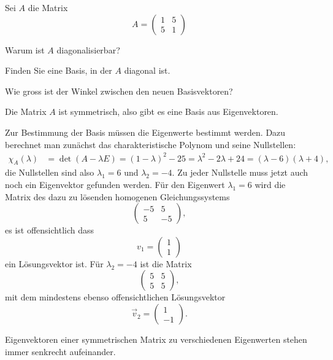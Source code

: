 Sei $A$ die Matrix
\[
A=\begin{pmatrix}
1&5\\
5&1
\end{pmatrix}
\]
\begin{teilaufgaben}
\item Warum ist $A$ diagonalisierbar?
\item Finden Sie eine Basis, in der $A$ diagonal ist.
\item Wie gross ist der Winkel zwischen den neuen Basisvektoren?
\end{teilaufgaben}

\begin{loesung}
\begin{teilaufgaben}
\item
Die Matrix $A$ ist symmetrisch, also gibt es eine Basis aus
Eigenvektoren.
\item
Zur Bestimmung der Basis müssen die Eigenwerte bestimmt werden.
Dazu berechnet man zunächst das charakteristische Polynom und
seine Nullstellen:
\begin{align*}
\chi_A(\lambda)
&=\det(A-\lambda E)=(1-\lambda)^2-25=\lambda^2-2\lambda +24
=(\lambda-6)(\lambda +4),
\end{align*}
die Nullstellen sind also $\lambda_1=6$ und $\lambda_2=-4$. Zu jeder
Nullstelle muss jetzt auch noch ein Eigenvektor gefunden werden.
Für den Eigenwert $\lambda_1=6$ wird die Matrix des dazu zu lösenden
homogenen Gleichungssystems
\[
\begin{pmatrix}-5&5\\5&-5\end{pmatrix},
\]
es ist offensichtlich dass
\[
v_1=\begin{pmatrix}1\\1\end{pmatrix}
\]
ein Lösungsvektor ist. Für $\lambda_2=-4$ ist die Matrix
\[
\begin{pmatrix}5&5\\5&5\end{pmatrix},
\]
mit dem mindestens ebenso offensichtlichen Lösungsvektor
\[
\vec v_2=\begin{pmatrix}1\\-1\end{pmatrix}.
\]
\item
Eigenvektoren einer symmetrischen Matrix zu verschiedenen Eigenwerten
stehen immer senkrecht aufeinander.
\qedhere
\end{teilaufgaben}
\end{loesung}

